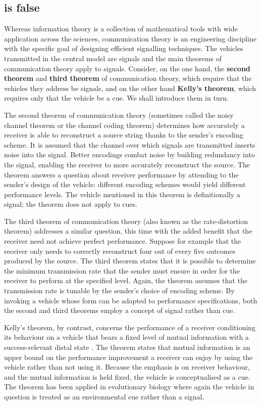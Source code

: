 \documentclass[12pt]{article}
\begin{document}
\subsection{\act{} is false}\label{subsec:actFalse}

Whereas information theory is a collection of mathematical tools with wide application across the sciences, communication theory is an engineering discipline with the specific goal of designing efficient signalling techniques.
The vehicles transmitted in the central model are signals and the main theorems of communication theory apply to signals.
Consider, on the one hand, the \textbf{second theorem} and \textbf{third theorem} of communication theory, which require that the vehicles they address be signals, and on the other hand \textbf{Kelly's theorem}, which requires only that the vehicle be a cue.
We shall introduce them in turn.

The second theorem of communication theory (sometimes called the noisy channel theorem or the channel coding theorem) determines how accurately a receiver is able to reconstruct a source string thanks to the sender's encoding scheme.
It is assumed that the channel over which signals are transmitted inserts noise into the signal.
Better encodings combat noise by building redundancy into the signal, enabling the receiver to more accurately reconstruct the source.
The theorem answers a question about receiver performance by attending to the sender's design of the vehicle: different encoding schemes would yield different performance levels.
The vehicle mentioned in this theorem is definitionally a signal; the theorem does not apply to cues.

The third theorem of communication theory (also known as the rate-distortion theorem) addresses a similar question, this time with the added benefit that the receiver need not achieve perfect performance.
Suppose for example that the receiver only needs to correctly reconstruct four out of every five outcomes produced by the source.
The third theorem states that it is possible to determine the minimum transmission rate that the sender must ensure in order for the receiver to perform at the specified level.
Again, the theorem assumes that the transmission rate is tunable by the sender's choice of encoding scheme.
By invoking a vehicle whose form can be adapted to performance specifications, both the second and third theorems employ a concept of signal rather than cue.

Kelly's theorem, by contrast, concerns the performance of a receiver conditioning its behaviour on a vehicle that bears a fixed level of mutual information with a success-relevant distal state \citep{kelly1956new}.
The theorem states that mutual information is an upper bound on the performance improvement a receiver can enjoy by using the vehicle rather than not using it.
Because the emphasis is on receiver behaviour, and the mutual information is held fixed, the vehicle is conceptualised as a cue.
The theorem has been applied in evolutionary biology \citep{donaldson-matasci2010fitness} where again the vehicle in question is treated as an environmental cue rather than a signal.
\end{document}
